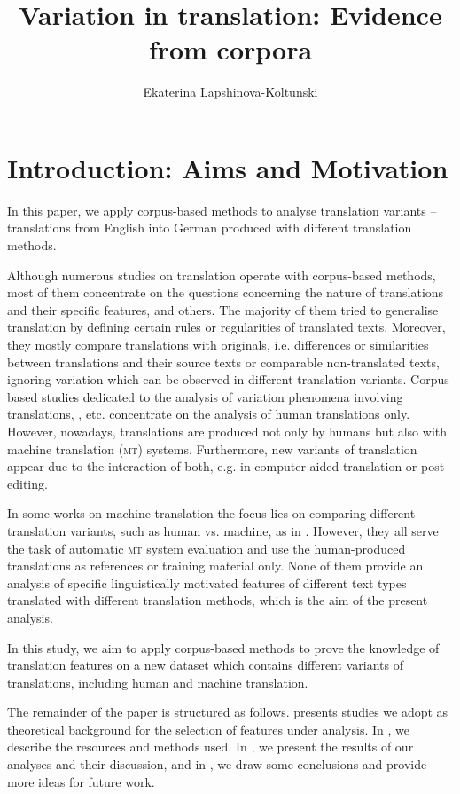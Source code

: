 \documentclass[output=paper]{LSP/langsci}
\author{Ekaterina Lapshinova-Koltunski}
\title{Variation in translation: Evidence from corpora}
\begin{document}
\section{Introduction: Aims and Motivation} \label{sec:4:1}

In this paper, we apply corpus-based methods to analyse translation variants – translations from English into German produced with different translation methods.

Although numerous studies on translation operate with corpus-based methods, most of them concentrate on the questions concerning the nature of translations and their specific features, \citep[e.g.][]{Baker1993,Baker1995,Laviosa2002,Chesterman2004} and others. The majority of them tried to generalise translation by deﬁning certain rules or regularities of translated texts.  Moreover, they mostly compare translations with originals, i.e. differences or similarities between translations and their source texts or comparable non-translated texts, ignoring variation which can be observed in different translation variants. Corpus-based studies dedicated to the analysis of variation phenomena involving translations, \citep[e.g.][]{Teich2003,Steiner2004,Neumann2013}, etc. concentrate on the analysis of human translations only. However, nowadays, translations are produced not only by humans but also with machine translation (\textsc{mt}) systems. Furthermore, new variants of translation appear due to the interaction of both, e.g. in computer-aided translation or post-editing.

In some works on machine translation the focus lies on comparing different translation variants, such as human vs. machine, as in  \citep{White1994,Papineni2002,BabychHartley2004,Popovic2011}. However, they all serve the task of automatic \textsc{mt} system evaluation and use the human-produced translations as references or training material only. None of them provide an analysis of specific linguistically motivated features of different text types translated with different translation methods, which is the aim of the present analysis.

In this study, we aim to apply corpus-based methods to prove the knowledge of translation features on a new dataset which contains different variants of translations, including human and machine translation.

The remainder of the paper is structured as follows.  presents studies we adopt as theoretical background for the selection of features under analysis. In , we describe the resources and methods used. In , we present the results of our analyses and their discussion, and in , we draw some conclusions and provide more ideas for future work.
\end{document}
